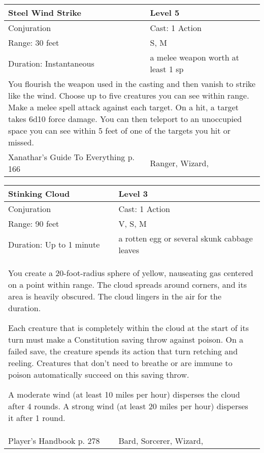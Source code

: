\documentclass[11pt]{report}
\begin{document}
\begin{table}[H]
	\begin{tabular}{||p{6cm}|p{6cm}||}
		\hline\hline
		\bf{Steel Wind Strike} & Level 5\\ \hline
		Conjuration & Cast: 1 Action\\ \hline
		Range: 30 feet & S, M\\ \hline
		Duration: Instantaneous & a melee weapon worth at least 1 sp\\ \hline
		\multicolumn{2}{||p{12cm}||}{You flourish the weapon used in the casting and then vanish to strike like the wind. Choose up to five creatures you can see within range. Make a melee spell attack against each target. On a hit, a target takes 6d10 force damage.
You can then teleport to an unoccupied space you can see within 5 feet of one of the targets you hit or missed.}\\ \hline
Xanathar's Guide To Everything p. 166 & Ranger, Wizard, \\ \hline\hline
	\end{tabular}
\end{table}

\begin{table}[H]
	\begin{tabular}{||p{6cm}|p{6cm}||}
		\hline\hline
		\bf{Stinking Cloud} & Level 3\\ \hline
		Conjuration & Cast: 1 Action\\ \hline
		Range: 90 feet & V, S, M\\ \hline
		Duration: Up to 1 minute & a rotten egg or several skunk cabbage leaves\\ \hline
		\multicolumn{2}{||p{12cm}||}{You create a 20-foot-radius sphere of yellow, nauseating gas centered on a point within range. The cloud spreads around corners, and its area is heavily obscured. The cloud lingers in the air for the duration.

Each creature that is completely within the cloud at the start of its turn must make a Constitution saving throw against poison. On a failed save, the creature spends its action that turn retching and reeling. Creatures that don’t need to breathe or are immune to poison automatically succeed on this saving throw.

A moderate wind (at least 10 miles per hour) disperses the cloud after 4 rounds. A strong wind (at least 20 miles per hour) disperses it after 1 round.}\\ \hline
Player's Handbook p. 278 & Bard, Sorcerer, Wizard, \\ \hline\hline
	\end{tabular}
\end{table}
\end{document}
